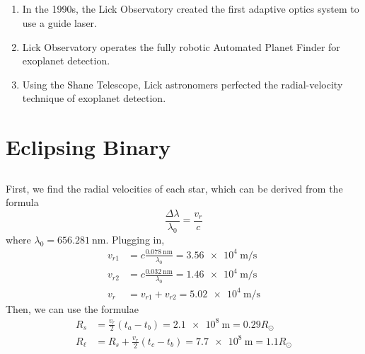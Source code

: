 \documentclass{article}
\begin{document}
\subsection{}

\begin{enumerate}
    \item In the 1990s, the Lick Observatory created the first adaptive optics system to use a guide laser.
    \item Lick Observatory operates the fully robotic Automated Planet Finder for exoplanet detection.
    \item Using the Shane Telescope, Lick astronomers perfected the radial-velocity technique of exoplanet detection.
\end{enumerate}

\section{Eclipsing Binary}

\subsection{}

First, we find the radial velocities of each star, which can be derived from the formula
\begin{equation}
    \frac{\Delta \lambda}{\lambda_0} = \frac{v_r}{c}
\end{equation}
where \(\lambda_0 = \SI{656.281}{\nano\meter}\).
Plugging in,
\begin{align}
    v_{r1} &= c \frac{\SI{0.078}{\nano\meter}}{\lambda_0} = \SI{3.56e+4}{\meter\per\second} \\
    v_{r2} &= c \frac{\SI{0.032}{\nano\meter}}{\lambda_0} = \SI{1.46e+4}{\meter\per\second} \\
    v_r &= v_{r1} + v_{r2} = \SI{5.02e+4}{\meter\per\second}
\end{align}
Then, we can use the formulae
\begin{align}
    R_s &= \frac{v_r}{2} (t_a - t_b) = \SI{2.1e+8}{\meter} = \num{0.29} R_\odot \\
    R_\ell &= R_s + \frac{v_r}{2} (t_c - t_b) = \SI{7.7e+8}{\meter} = \num{1.1} R_\odot 
\end{align}

\subsection{}
\end{document}

